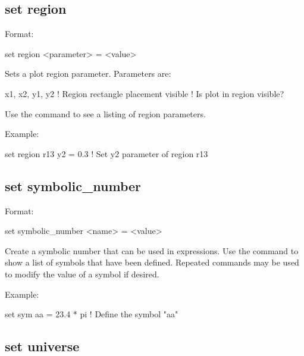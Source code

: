 {{{{{%

\subsection{set region}
\label{s:set.region}

Format:
\begin{example}
  set region <parameter> = <value>
\end{example}

Sets a plot region parameter. Parameters are:
\begin{example}
  x1, x2, y1, y2    ! Region rectangle placement
  visible           ! Is plot in region visible?
\end{example}

Use the  command to see a listing of region parameters.

Example:
\begin{example}
  set region r13 y2 = 0.3  ! Set y2 parameter of region r13
\end{example}


\subsection{set symbolic_number}
\label{s:set.symbolic}

Format:
\begin{example}
  set symbolic_number <name> = <value>
\end{example}

Create a symbolic number that can be used in expressions. Use the  command
to show a list of symbols that have been defined. Repeated  commands may be used to modify
the value of a symbol if desired.

Example:
\begin{example}
  set sym aa = 23.4 * pi  ! Define the symbol "aa"
\end{example}


\subsection{set universe}
\label{s:set.universe}

}}}}}
